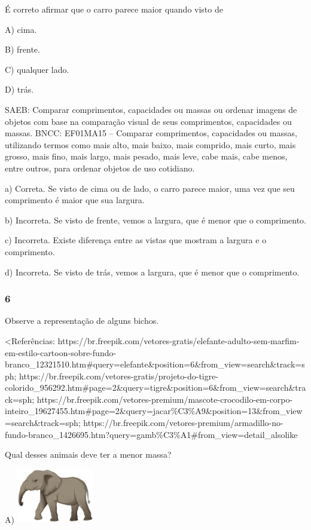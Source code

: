 \begin{itemize}
\begin{itemize}
É correto afirmar que o carro parece maior quando visto de

A) cima.

B) frente.

C) qualquer lado.

D) trás.

SAEB: Comparar comprimentos, capacidades ou massas ou ordenar
imagens de objetos com base na comparação visual de seus comprimentos,
capacidades ou massas.
BNCC: EF01MA15 -- Comparar comprimentos, capacidades ou massas,
utilizando termos como mais alto, mais baixo, mais comprido, mais curto,
mais grosso, mais fino, mais largo, mais pesado, mais leve, cabe mais,
cabe menos, entre outros, para ordenar objetos de uso cotidiano.

a) Correta. Se visto de cima ou de lado, o carro parece maior, uma vez
que seu comprimento é maior que sua largura.

b) Incorreta. Se visto de frente, vemos a largura, que é menor que o
comprimento.

c) Incorreta. Existe diferença entre as vistas que mostram a largura e o
comprimento.

d) Incorreta. Se visto de trás, vemos a largura, que é menor que o
comprimento.

\subsubsection{6}\label{section-122}

Observe a representação de alguns bichos.

\textless{}Referências:
https://br.freepik.com/vetores-gratis/elefante-adulto-sem-marfim-em-estilo-cartoon-sobre-fundo-branco\_12321510.htm\#query=elefante\&position=6\&from\_view=search\&track=sph;
https://br.freepik.com/vetores-gratis/projeto-do-tigre-colorido\_956292.htm\#page=2\&query=tigre\&position=6\&from\_view=search\&track=sph;
https://br.freepik.com/vetores-premium/mascote-crocodilo-em-corpo-inteiro\_19627455.htm\#page=2\&query=jacar\%C3\%A9\&position=13\&from\_view=search\&track=sph;
https://br.freepik.com/vetores-premium/armadillo-no-fundo-branco\_1426695.htm?query=gamb\%C3\%A1\#from\_view=detail\_alsolike

Qual desses animais deve ter a menor massa?

A)
\includegraphics[width=1.32371in,height=0.93254in]{media/image147.jpg}


\end{itemize}
\end{itemize}
